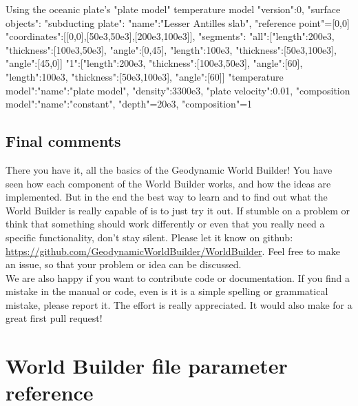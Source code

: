 \documentclass{book}
\newcommand{\GWB}{{Geodynamic World Builder}}
\newcommand{\WB}{{World Builder}}
\begin{document}
\begin{bashcode}{Using the oceanic plate's "plate model" temperature model}
"version":0,
"surface objects":
{
  "subducting plate":
  {
    "name":"Lesser Antilles slab", "reference point"=[0,0]
    "coordinates":[[0,0],[50e3,50e3],[200e3,100e3]],
    "segments":
    {
      "all":[{"length":200e3, "thickness":[100e3,50e3], "angle":[0,45]},
              {"length":100e3, "thickness":[50e3,100e3], "angle":[45,0]}]
      "1":[{"length":200e3, "thickness":[100e3,50e3], "angle":[60]},
             {"length":100e3, "thickness":[50e3,100e3], "angle":[60]}]
    }
    "temperature model":{"name":"plate model", "density":3300e3, 
                           "plate velocity":0.01},
    "composition model":{"name":"constant", "depth"=20e3, "composition"=1}
  }
}
\end{bashcode}
\section{Final comments}
There you have it, all the basics of the \GWB{}! You have seen how each component of the \WB{} works, and how the ideas are implemented. But in the end the best way to learn and to find out what the \WB{} is really capable of is to just try it out. If stumble on a problem or think that something should work differently or even that you really need a specific functionality, don't stay silent. Please let it know on github: \url{https://github.com/GeodynamicWorldBuilder/WorldBuilder}. Feel free to make an issue, so that your problem or idea can be discussed. 
\\
We are also happy if you want to contribute code or documentation. If you find a mistake in the manual or code, even is it is a simple spelling or grammatical mistake, please report it. The effort is really appreciated. It would also make for a great first pull request!
\chapter{\WB{} file parameter reference}
\label{chapter:WB_file_parameter_reference}
\end{document}
